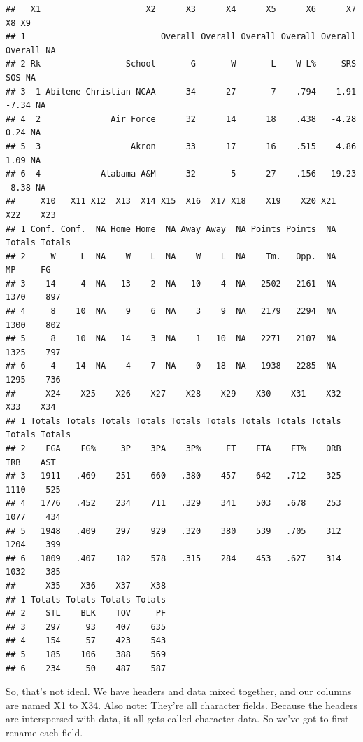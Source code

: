 \documentclass[
]{book}
\begin{document}
\begin{verbatim}
##   X1                     X2      X3      X4      X5      X6      X7      X8 X9
## 1                           Overall Overall Overall Overall Overall Overall NA
## 2 Rk                 School       G       W       L    W-L%     SRS     SOS NA
## 3  1 Abilene Christian NCAA      34      27       7    .794   -1.91   -7.34 NA
## 4  2              Air Force      32      14      18    .438   -4.28    0.24 NA
## 5  3                  Akron      33      17      16    .515    4.86    1.09 NA
## 6  4            Alabama A&M      32       5      27    .156  -19.23   -8.38 NA
##     X10   X11 X12  X13  X14 X15  X16  X17 X18    X19    X20 X21    X22    X23
## 1 Conf. Conf.  NA Home Home  NA Away Away  NA Points Points  NA Totals Totals
## 2     W     L  NA    W    L  NA    W    L  NA    Tm.   Opp.  NA     MP     FG
## 3    14     4  NA   13    2  NA   10    4  NA   2502   2161  NA   1370    897
## 4     8    10  NA    9    6  NA    3    9  NA   2179   2294  NA   1300    802
## 5     8    10  NA   14    3  NA    1   10  NA   2271   2107  NA   1325    797
## 6     4    14  NA    4    7  NA    0   18  NA   1938   2285  NA   1295    736
##      X24    X25    X26    X27    X28    X29    X30    X31    X32    X33    X34
## 1 Totals Totals Totals Totals Totals Totals Totals Totals Totals Totals Totals
## 2    FGA    FG%     3P    3PA    3P%     FT    FTA    FT%    ORB    TRB    AST
## 3   1911   .469    251    660   .380    457    642   .712    325   1110    525
## 4   1776   .452    234    711   .329    341    503   .678    253   1077    434
## 5   1948   .409    297    929   .320    380    539   .705    312   1204    399
## 6   1809   .407    182    578   .315    284    453   .627    314   1032    385
##      X35    X36    X37    X38
## 1 Totals Totals Totals Totals
## 2    STL    BLK    TOV     PF
## 3    297     93    407    635
## 4    154     57    423    543
## 5    185    106    388    569
## 6    234     50    487    587
\end{verbatim}

So, that's not ideal. We have headers and data mixed together, and our columns are named X1 to X34. Also note: They're all character fields. Because the headers are interspersed with data, it all gets called character data. So we've got to first rename each field.
\end{document}
